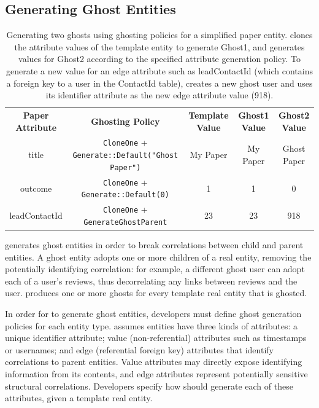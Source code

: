 \subsection{Generating Ghost Entities}
\label{sec:ghosting}
\begin{table}[ht!]
    \centering
    \footnotesize
\begin{tabular}{@{}ccccc@{}}
\textbf{Paper Attribute} & \textbf{Ghosting Policy} & \textbf{Template Value} & \textbf{Ghost1 Value} & \textbf{Ghost2 Value} 
  \\ \cmidrule(r){1-5}
{title} & \texttt{CloneOne} + \texttt{Generate::Default("Ghost Paper")} & My Paper & My
    Paper & Ghost Paper \\
{outcome} & \texttt{CloneOne} + \texttt{Generate::Default(0)} & 1 & 1 & 0 \\
{leadContactId} & \texttt{CloneOne} + \texttt{GenerateGhostParent} & 23 & 23 & 918 \\
\end{tabular}
    \caption{Generating two ghosts using ghosting policies for a simplified paper entity.
    \sys clones the attribute values of the template entity to generate Ghost1, and generates
    values for Ghost2 according to the specified attribute generation policy. To generate a new
    value for an edge attribute such as leadContactId (which contains a foreign key to a user in the
    ContactId table), \sys creates a new ghost user and uses its identifier attribute as the new
    edge attribute value (918).}
    \label{tab:ghosting}
\end{table}

\sys generates ghost entities in order to break correlations between child and parent entities.  A
ghost entity adopts one or more children of a real entity, removing the potentially identifying
correlation: for example, a different ghost user can adopt each of a user's reviews, thus
decorrelating any links between reviews and the user. \sys produces one or more ghosts for every
template real entity that is ghosted. 

In order for \sys to generate ghost entities, developers must define ghost generation policies for
each entity type.  \sys assumes entities have three kinds of attributes: a unique identifier
attribute; value (non-referential) attributes such as timestamps or usernames; and edge (referential
foreign key) attributes that identify correlations to parent entities.  Value attributes may
directly expose identifying information from its contents, and edge attributes represent potentially
sensitive structural correlations.  Developers specify how \sys should generate each of these
attributes, given a template real entity.

